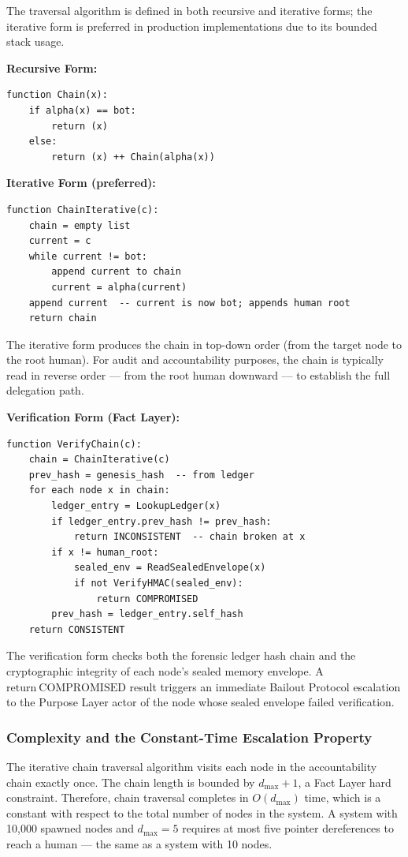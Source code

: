 The traversal algorithm is defined in both recursive and iterative forms; the iterative form is preferred in production implementations due to its bounded stack usage.

\medskip
\noindent\textbf{Recursive Form:}
\begin{verbatim}
function Chain(x):
    if alpha(x) == bot:
        return (x)
    else:
        return (x) ++ Chain(alpha(x))
\end{verbatim}

\medskip
\noindent\textbf{Iterative Form (preferred):}
\begin{verbatim}
function ChainIterative(c):
    chain = empty list
    current = c
    while current != bot:
        append current to chain
        current = alpha(current)
    append current  -- current is now bot; appends human root
    return chain
\end{verbatim}

The iterative form produces the chain in top-down order (from the target node to the root human). For audit and accountability purposes, the chain is typically read in reverse order — from the root human downward — to establish the full delegation path.

\medskip
\noindent\textbf{Verification Form (Fact Layer):}
\begin{verbatim}
function VerifyChain(c):
    chain = ChainIterative(c)
    prev_hash = genesis_hash  -- from ledger
    for each node x in chain:
        ledger_entry = LookupLedger(x)
        if ledger_entry.prev_hash != prev_hash:
            return INCONSISTENT  -- chain broken at x
        if x != human_root:
            sealed_env = ReadSealedEnvelope(x)
            if not VerifyHMAC(sealed_env):
                return COMPROMISED
        prev_hash = ledger_entry.self_hash
    return CONSISTENT
\end{verbatim}

The verification form checks both the forensic ledger hash chain and the cryptographic integrity of each node's sealed memory envelope. A $\mathrm{return\ COMPROMISED}$ result triggers an immediate Bailout Protocol escalation to the Purpose Layer actor of the node whose sealed envelope failed verification.

\subsubsection{Complexity and the Constant-Time Escalation Property}
\label{sec:complexity}

The iterative chain traversal algorithm visits each node in the accountability chain exactly once. The chain length is bounded by $d_{\max} + 1$, a Fact Layer hard constraint. Therefore, chain traversal completes in $O(d_{\max})$ time, which is a constant with respect to the total number of nodes in the system. A system with 10,000 spawned nodes and $d_{\max} = 5$ requires at most five pointer dereferences to reach a human — the same as a system with 10 nodes.

